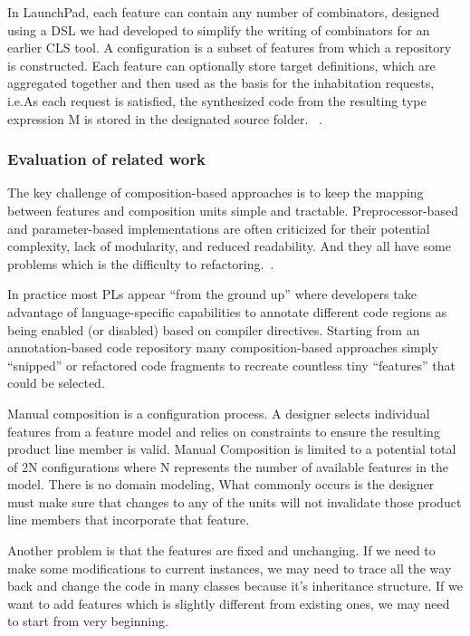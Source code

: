 In LaunchPad, each feature can contain any number of combinators, designed using a DSL we had developed to
simplify the writing of combinators for an earlier CLS tool. A configuration is a subset of features from
which a repository is constructed. Each feature can optionally store target definitions, which are aggregated
 together and then used as the basis for the inhabitation requests, i.e.As each request is satisfied, the
 synthesized code from the resulting type expression M is stored in the designated source folder.
~\cite{Heineman:2015:TMO:2791060.2791076}.

\subsubsection{Evaluation of related work}

The key challenge of composition-based approaches is to keep the mapping between features and composition units
simple and tractable. Preprocessor-based and parameter-based implementations are often criticized for their
potential complexity, lack of modularity, and reduced readability. And they all have some problems which is the
difficulty to refactoring.~\cite{Kim:2017:RJS:3106195.3106201}.

In practice most PLs appear “from the ground up” where developers take advantage of language-specific capabilities
 to annotate different code regions as being enabled (or disabled) based on compiler directives. Starting from an
 annotation-based code repository many composition-based approaches simply “snipped” or refactored code fragments
 to recreate countless tiny “features” that could be selected.

Manual composition is a configuration process. A designer selects individual features from a feature model and
relies on constraints to ensure the resulting product line member is valid. Manual Composition is limited to a
potential total of 2N configurations where N represents the number of available features in the model. There is no
 domain modeling, What commonly occurs is the designer must make sure that changes to any of the units will not invalidate those product
 line members that incorporate that feature.

 Another problem is that the features are fixed and unchanging. If we need to make some modifications to current
 instances, we may need to trace all the way back and change the code in many classes because it’s inheritance
 structure. If we want to add features which is slightly different from existing ones, we may need to start from
 very beginning.
